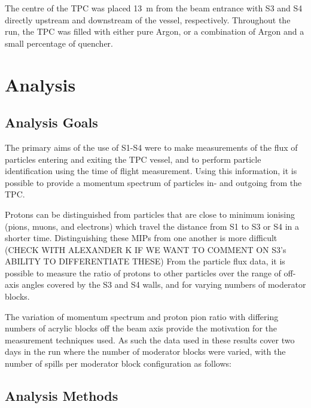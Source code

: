 The centre of the TPC was placed 13~m from the beam entrance with S3 and S4 directly upstream and downstream of the vessel, respectively. Throughout the run, the TPC was filled with either pure Argon, or a combination of Argon and a small percentage of quencher.



\section{Analysis}
\subsection{Analysis Goals}
The primary aims of the use of S1-S4 were to make measurements of the flux of particles entering and exiting the TPC vessel, and to perform particle identification using the time of flight measurement.
Using this information, it is possible to provide a momentum spectrum of particles in- and outgoing from the TPC.

Protons can be distinguished from particles that are close to minimum ionising (pions, muons, and electrons) which travel the distance from S1 to S3 or S4 in a shorter time.
Distinguishing these MIPs from one another is more difficult (CHECK WITH ALEXANDER K IF WE WANT TO COMMENT ON S3's ABILITY TO DIFFERENTIATE THESE)
From the particle flux data, it is possible to measure the ratio of protons to other particles over the range of off-axis angles covered by the S3 and S4 walls, and for varying numbers of moderator blocks.

The variation of momentum spectrum and proton pion ratio with differing numbers of acrylic blocks off the beam axis provide the motivation for the measurement techniques used.
As such the data used in these results cover two days in the run where the number of moderator blocks were varied, with the number of spills per moderator block configuration as follows:


\subsection{Analysis Methods}

